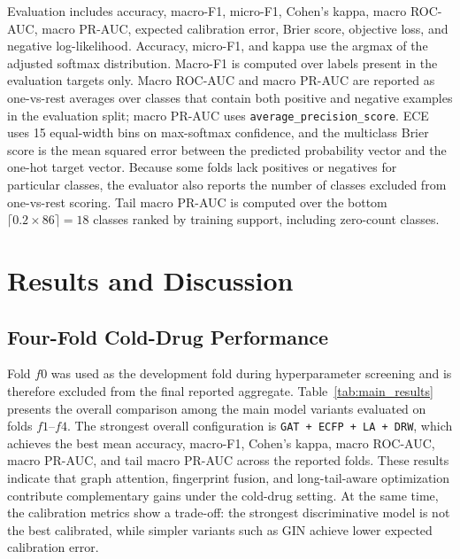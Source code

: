 \documentclass[12pt,a4paper]{report}
\begin{document}
Evaluation includes accuracy, macro-F1, micro-F1, Cohen's kappa, macro ROC-AUC, macro PR-AUC, expected calibration error, Brier score, objective loss, and negative log-likelihood. Accuracy, micro-F1, and kappa use the argmax of the adjusted softmax distribution. Macro-F1 is computed over labels present in the evaluation targets only. Macro ROC-AUC and macro PR-AUC are reported as one-vs-rest averages over classes that contain both positive and negative examples in the evaluation split; macro PR-AUC uses \texttt{average\_precision\_score}. ECE uses 15 equal-width bins on max-softmax confidence, and the multiclass Brier score is the mean squared error between the predicted probability vector and the one-hot target vector. Because some folds lack positives or negatives for particular classes, the evaluator also reports the number of classes excluded from one-vs-rest scoring. Tail macro PR-AUC is computed over the bottom \(\lceil 0.2 \times 86 \rceil = 18\) classes ranked by training support, including zero-count classes.

\chapter{Results and Discussion}
\section{Four-Fold Cold-Drug Performance}
Fold \(f0\) was used as the development fold during hyperparameter screening and is therefore excluded from the final reported aggregate. Table~\ref{tab:main_results} presents the overall comparison among the main model variants evaluated on folds \(f1\)--\(f4\). The strongest overall configuration is \texttt{GAT + ECFP + LA + DRW}, which achieves the best mean accuracy, macro-F1, Cohen's kappa, macro ROC-AUC, macro PR-AUC, and tail macro PR-AUC across the reported folds. These results indicate that graph attention, fingerprint fusion, and long-tail-aware optimization contribute complementary gains under the cold-drug setting. At the same time, the calibration metrics show a trade-off: the strongest discriminative model is not the best calibrated, while simpler variants such as GIN achieve lower expected calibration error.
\end{document}
